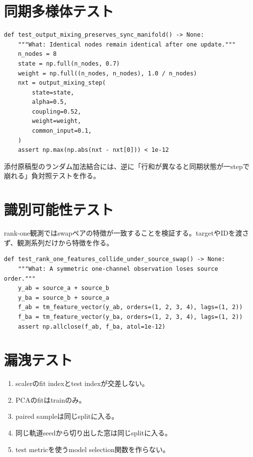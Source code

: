 \documentclass[a4paper,11pt,oneside,openany]{ltjsbook}
\begin{document}
\section{同期多様体テスト}

\begin{lstlisting}[style=pythonstyle,caption={同期不変性テストの例。}]
def test_output_mixing_preserves_sync_manifold() -> None:
    """What: Identical nodes remain identical after one update."""
    n_nodes = 8
    state = np.full(n_nodes, 0.7)
    weight = np.full((n_nodes, n_nodes), 1.0 / n_nodes)
    nxt = output_mixing_step(
        state=state,
        alpha=0.5,
        coupling=0.52,
        weight=weight,
        common_input=0.1,
    )
    assert np.max(np.abs(nxt - nxt[0])) < 1e-12
\end{lstlisting}

添付原稿型のランダム加法結合には、逆に「行和が異なると同期状態が一stepで崩れる」負対照テストを作る。

\section{識別可能性テスト}

rank-one観測ではswapペアの特徴が一致することを検証する。targetやIDを渡さず、観測系列だけから特徴を作る。

\begin{lstlisting}[style=pythonstyle,caption={rank-one衝突の負対照。}]
def test_rank_one_features_collide_under_source_swap() -> None:
    """What: A symmetric one-channel observation loses source order."""
    y_ab = source_a + source_b
    y_ba = source_b + source_a
    f_ab = tm_feature_vector(y_ab, orders=(1, 2, 3, 4), lags=(1, 2))
    f_ba = tm_feature_vector(y_ba, orders=(1, 2, 3, 4), lags=(1, 2))
    assert np.allclose(f_ab, f_ba, atol=1e-12)
\end{lstlisting}

\section{漏洩テスト}

\begin{enumerate}
  \item scalerのfit indexとtest indexが交差しない。
  \item PCAのfitはtrainのみ。
  \item paired sampleは同じsplitに入る。
  \item 同じ軌道seedから切り出した窓は同じsplitに入る。
  \item test metricを使うmodel selection関数を作らない。
\end{enumerate}
\end{document}
